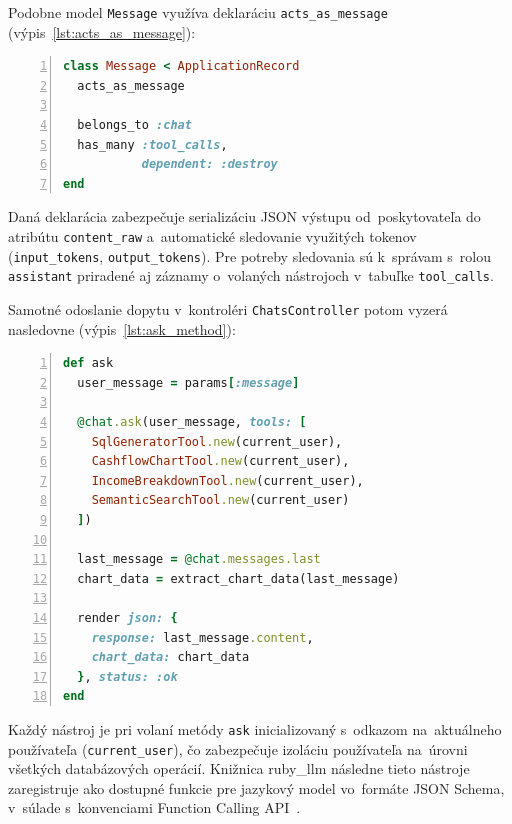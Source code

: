 Podobne model \texttt{Message} využíva deklaráciu \texttt{acts\_as\_message} (výpis~\ref{lst:acts_as_message}):

\begin{lstlisting}[language=Ruby,
    caption={Deklarácia \texttt{acts\_as\_message} v modeli Message},
    label={lst:acts_as_message},
    basicstyle=\ttfamily\small,
    keywordstyle=\color{blue},
    commentstyle=\color{gray},
    stringstyle=\color{red!70!black},
    numbers=left,
    numberstyle=\tiny\color{gray},
    breaklines=true,
    frame=single
]
class Message < ApplicationRecord
  acts_as_message

  belongs_to :chat
  has_many :tool_calls,
           dependent: :destroy
end
\end{lstlisting}

Daná deklarácia zabezpečuje serializáciu JSON výstupu od~poskytovateľa do~
atribútu \texttt{content\_raw} a~automatické sledovanie využitých tokenov (\texttt{input\_tokens},
\texttt{output\_tokens}). Pre potreby sledovania sú k~správam s~rolou \texttt{assistant}
priradené aj záznamy o~volaných nástrojoch v~tabuľke \texttt{tool\_calls}.

Samotné odoslanie dopytu v~kontroléri \texttt{ChatsController} potom vyzerá
nasledovne (výpis~\ref{lst:ask_method}):

\begin{lstlisting}[language=Ruby,
    caption={Spracovanie dopytu v metóde \texttt{ask} kontroléra ChatsController},
    label={lst:ask_method},
    basicstyle=\ttfamily\small,
    keywordstyle=\color{blue},
    commentstyle=\color{gray},
    stringstyle=\color{red!70!black},
    numbers=left,
    numberstyle=\tiny\color{gray},
    breaklines=true,
    frame=single
]
def ask
  user_message = params[:message]

  @chat.ask(user_message, tools: [
    SqlGeneratorTool.new(current_user),
    CashflowChartTool.new(current_user),
    IncomeBreakdownTool.new(current_user),
    SemanticSearchTool.new(current_user)
  ])

  last_message = @chat.messages.last
  chart_data = extract_chart_data(last_message)

  render json: {
    response: last_message.content,
    chart_data: chart_data
  }, status: :ok
end
\end{lstlisting}

Každý nástroj je pri volaní metódy \texttt{ask} inicializovaný s~odkazom na~aktuálneho
používateľa (\texttt{current\_user}), čo zabezpečuje izoláciu používateľa na~úrovni
všetkých databázových operácií. Knižnica ruby\_llm následne tieto nástroje zaregistruje
ako dostupné funkcie pre jazykový model vo~formáte JSON Schema, v~súlade s~konvenciami
Function Calling API~\cite{rubyllm2025}.

